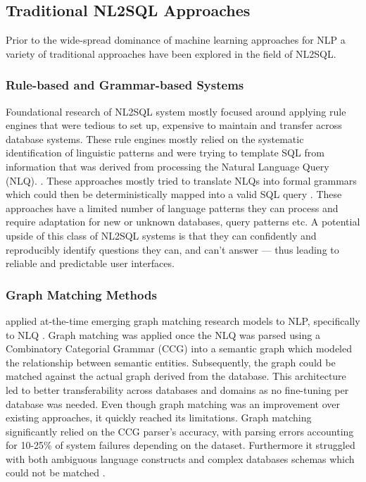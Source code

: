 \subsection{Traditional NL2SQL Approaches}

Prior to the wide-spread dominance of machine learning approaches for NLP
a variety of traditional approaches have been explored in the field of NL2SQL.

\subsubsection{Rule-based and Grammar-based Systems}

Foundational research of NL2SQL system mostly focused around applying rule
engines that were tedious to set up, expensive to maintain and transfer
across database systems. These rule engines mostly relied on the systematic
identification of linguistic patterns and were trying to template SQL from
information that was derived from processing the Natural Language Query (NLQ).
\citep{Rendezvous, Lunar, Ladder}. These approaches mostly tried to translate
NLQs into formal grammars which could then be deterministically mapped into a
valid SQL query \citep{Lunar}. These approaches have a limited number of
language patterns they can process and require adaptation for new or unknown
databases, query patterns etc. A potential upside of this class of NL2SQL
systems is that they can confidently and reproducibly identify questions they
can, and can't answer — thus leading to reliable and predictable user
interfaces.

\subsubsection{Graph Matching Methods}

\citeauthor{GraphMatching} applied at-the-time emerging graph matching research
models to NLP, specifically to NLQ \citep{GraphMatching}. Graph matching was
applied once the NLQ was parsed using a Combinatory Categorial Grammar (CCG)
into a semantic graph which modeled the relationship between semantic entities.
Subsequently, the graph could be matched against the actual graph derived from
the database. This architecture led to better transferability across databases
and domains as no fine-tuning per database was needed. Even though graph
matching was an improvement over existing approaches, it quickly reached its
limitations. Graph matching significantly relied on the CCG parser's accuracy,
with parsing errors accounting for 10-25\% of system failures depending on the
dataset. Furthermore it struggled with both ambiguous language constructs and
complex databases schemas which could not be matched
\citep[p.~387]{GraphMatching}.

